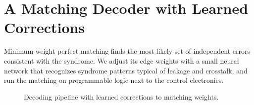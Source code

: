 \chapter{A Matching Decoder with Learned Corrections}
\label{ch:method}

Minimum-weight perfect matching finds the most likely set of independent errors consistent with
the syndrome. We adjust its edge weights with a small neural network that recognizes syndrome
patterns typical of leakage and crosstalk, and run the matching on programmable logic next to the
control electronics.

\begin{figure}[htbp]
  \centering
  \caption{Decoding pipeline with learned corrections to matching weights.}
  \label{fig:decoder}
\end{figure}
